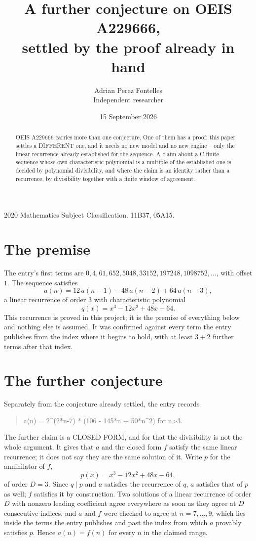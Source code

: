 \documentclass[11pt,a4paper]{article}
\title{A further conjecture on OEIS A229666,\\ \large settled by the proof already in hand}
\author{Adrian Perez Fontelles\\ \small Independent researcher}
\date{15 September 2026}
\theoremstyle{plain}
\theoremstyle{definition}
\begin{document}
\maketitle

\begin{abstract}
OEIS A229666 carries more than one conjecture. One of them has a proof; this paper settles a
DIFFERENT one, and it needs no new model and no new engine -- only the linear recurrence already
established for the sequence. A claim about a C-finite sequence whose own characteristic
polynomial is a multiple of the established one is decided by polynomial divisibility, and where
the claim is an identity rather than a recurrence, by divisibility together with a finite window
of agreement.
\end{abstract}

\noindent\small 2020 Mathematics Subject Classification. 11B37, 05A15.\normalsize

\section{The premise}

The entry's first terms are $0, 4, 61, 652, 5048, 33152, 197248, 1098752,\dots$, with offset $1$. The sequence satisfies
\[
  a(n)=12\,a(n-1) - 48\,a(n-2) + 64\,a(n-3) ,
\]
a linear recurrence of order $3$ with characteristic polynomial
\[
  q(x)=x^{3} - 12 x^{2} + 48 x - 64 .
\]
This recurrence is proved in this project; it is the premise of everything below and nothing else is assumed.
It was confirmed against every term the entry publishes from the index where it begins to hold,
with at least $3+2$ further terms after that index.

\section{The further conjecture}

Separately from the conjecture already settled, the entry records

\begin{quote}\raggedright a(n) = 2\^{}(2*n-7) * (106 - 145*n + 50*n\^{}2) for n>3.\end{quote}

The further claim is a CLOSED FORM, and for that the divisibility is not the whole argument. It
gives that $a$ and the closed form $f$ satisfy the same linear recurrence; it does not say they
are the same solution of it. Write $p$ for the annihilator of $f$,
\[
  p(x)=x^{3} - 12 x^{2} + 48 x - 64 ,
\]
of order $D=3$. Since $q\mid p$ and $a$ satisfies the recurrence of $q$, $a$ satisfies that of
$p$ as well; $f$ satisfies it by construction. Two solutions of a linear recurrence of order $D$
with nonzero leading coefficient agree everywhere as soon as they agree at $D$ consecutive
indices, and $a$ and $f$ were checked to agree at $n=7,\dots,9$,
which lies inside the terms the entry publishes and past the index from which $a$ provably
satisfies $p$. Hence $a(n)=f(n)$ for every $n$ in the claimed range.
\end{document}
